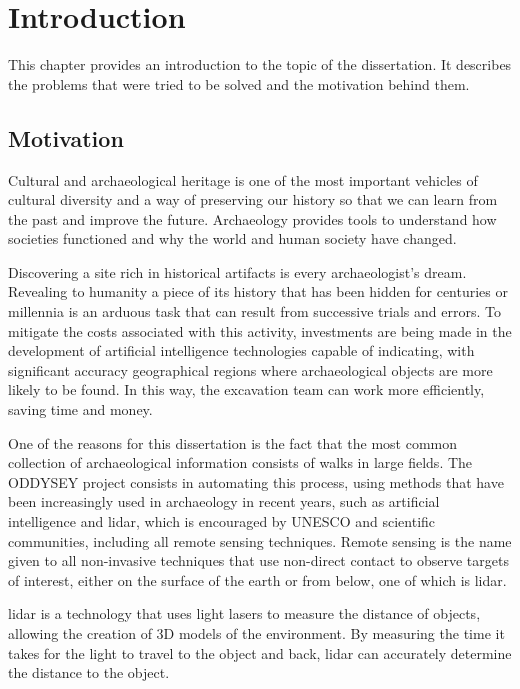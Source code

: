 

\chapter{Introduction}
\label{chapter:introduction}

This chapter provides an introduction to the topic of the dissertation. It describes the problems that were tried to be solved and the motivation behind them.
\section{Motivation}
Cultural and archaeological heritage is one of the most important vehicles of cultural diversity and a way of preserving our history so that we can learn from the past and improve the future. Archaeology provides tools to understand how societies functioned and why the world and human society have changed.

Discovering a site rich in historical artifacts is every archaeologist's dream. Revealing to humanity a piece of its history that has been hidden for centuries or millennia is an arduous task that can result from successive trials and errors. To mitigate the costs associated with this activity, investments are being made in the development of artificial intelligence technologies\cite{bravenewworld} capable of indicating, with significant accuracy geographical regions where archaeological objects are more likely to be found. In this way, the excavation team can work more efficiently, saving time and money.

One of the reasons for this dissertation is the fact that the most common collection of archaeological information consists of walks in large fields. The ODDYSEY project consists in automating this process, using methods that have been increasingly used in archaeology in recent years, such as artificial intelligence and \ac{lidar}, which is encouraged by UNESCO and scientific communities\cite{asmr}, including all remote sensing techniques.
Remote sensing is the name given to all non-invasive techniques that use non-direct contact to observe targets of interest, either on the surface of the earth or from below, one of which is \ac{lidar}.

\ac{lidar} is a technology that uses light lasers to measure the distance of objects, allowing the creation of 3D models of the environment. By measuring the time it takes for the light to travel to the object and back, \ac{lidar} can accurately determine the distance to the object.

